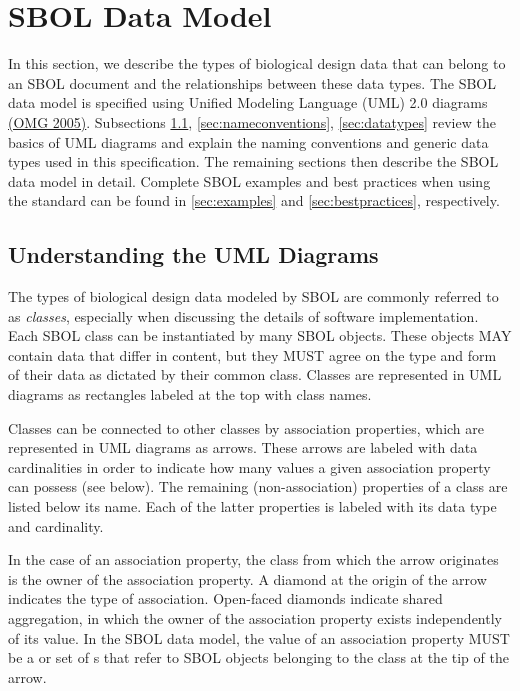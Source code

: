 
\section{SBOL Data Model}\label{sec:model}

In this section, we describe the types of biological design data that can belong to an SBOL document and the relationships between these data types. The SBOL data model is specified using Unified Modeling Language (UML) 2.0 diagrams \href{http://www.omg.org/spec/UML/2.0/}{(OMG 2005)}. Subsections \ref{sec:umldiagrams}, \ref{sec:nameconventions}, \ref{sec:datatypes} review the basics of UML diagrams and explain the naming conventions and generic data types used in this specification. The remaining sections then describe the SBOL data model in detail. Complete SBOL examples and best practices when using the standard can be found in \ref{sec:examples} and \ref{sec:bestpractices}, respectively.

\subsection{Understanding the UML Diagrams}
\label{sec:umldiagrams}

The types of biological design data modeled by SBOL are commonly referred to as {\em classes}, especially when discussing the details of software implementation. Each SBOL class can be instantiated by many SBOL objects. These objects MAY contain data that differ in content, but they MUST agree on the type and form of their data as dictated by their common class. Classes are represented in UML diagrams as rectangles labeled at the top with class names.

Classes can be connected to other classes by association properties, which are represented in UML diagrams as arrows. These arrows are labeled with data cardinalities in order to indicate how many values a given association property can possess (see below). The remaining (non-association) properties of a class are listed below its name. Each of the latter properties is labeled with its data type and cardinality.

In the case of an association property, the class from which the arrow originates is the owner of the association property. A diamond at the origin of the arrow indicates the type of association. Open-faced diamonds indicate shared aggregation, in which the owner of the association property exists independently of its value. In the SBOL data model, the value of an association property MUST be a  or set of s that refer to SBOL objects belonging to the class at the tip of the arrow.

